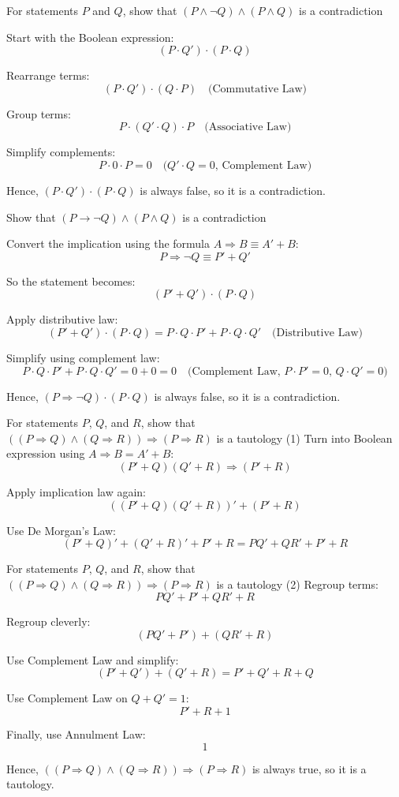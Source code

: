 \documentclass{beamer}
\begin{document}
\begin{frame}{For statements $P$ and $Q$, show that $(P \wedge \neg Q) \wedge (P \wedge Q)$ is a contradiction}

Start with the Boolean expression:  
\[
(P \cdot Q') \cdot (P \cdot Q)
\]

Rearrange terms:  
\[
(P \cdot Q') \cdot (Q \cdot P) \quad \text{(Commutative Law)}
\]

Group terms:  
\[
P \cdot (Q' \cdot Q) \cdot P \quad \text{(Associative Law)}
\]

Simplify complements:  
\[
P \cdot 0 \cdot P = 0 \quad \text{($Q' \cdot Q = 0$, Complement Law)}
\]


\alert{Hence, $(P \cdot Q') \cdot (P \cdot Q)$ is always false, so it is a contradiction.}
\end{frame}

\begin{frame}{Show that $(P \rightarrow \neg Q) \wedge (P \wedge Q)$ is a contradiction}

Convert the implication using the formula $A \Rightarrow B \equiv A' + B$:  
\[
P \Rightarrow \neg Q \equiv P' + Q'
\]

So the statement becomes:  
\[
(P' + Q') \cdot (P \cdot Q)
\]

Apply distributive law:  
\[
(P' + Q') \cdot (P \cdot Q) = P \cdot Q \cdot P' + P \cdot Q \cdot Q' \quad \text{(Distributive Law)}
\]

Simplify using complement law:  
\[
P \cdot Q \cdot P' + P \cdot Q \cdot Q' = 0 + 0 = 0 \quad \text{(Complement Law, $P \cdot P' = 0$, $Q \cdot Q' = 0$)}
\]

\alert{Hence, $(P \Rightarrow \neg Q) \cdot (P \cdot Q)$ is always false, so it is a contradiction.}
\end{frame}

\begin{frame}{For statements $P$, $Q$, and $R$, show that $((P \Rightarrow Q) \wedge (Q \Rightarrow R)) \Rightarrow (P \Rightarrow R)$ is a tautology (1)}
Turn into Boolean expression using $A \Rightarrow B = A' + B$:
\[
(P'+Q)(Q'+R) \Rightarrow (P'+R)
\]

Apply implication law again:
\[
((P'+Q)(Q'+R))' + (P'+R)
\]

Use De Morgan's Law:
\[
(P'+Q)' + (Q'+R)' + P' + R = PQ' + QR' + P' + R
\]
\end{frame}

\begin{frame}{For statements $P$, $Q$, and $R$, show that $((P \Rightarrow Q) \wedge (Q \Rightarrow R)) \Rightarrow (P \Rightarrow R)$ is a tautology (2)}
Regroup terms:
\[
PQ' + P' + QR' + R
\]

Regroup cleverly:
\[
(PQ' + P') + (QR' + R)
\]

Use Complement Law and simplify:
\[
(P'+Q') + (Q'+R) = P' + Q' + R + Q
\]

Use Complement Law on $Q+Q'=1$:
\[
P' + R + 1
\]

Finally, use Annulment Law:
\[
1
\]

\alert{Hence, $((P \Rightarrow Q) \wedge (Q \Rightarrow R)) \Rightarrow (P \Rightarrow R)$ is always true, so it is a tautology.}
\end{frame}
\end{document}
